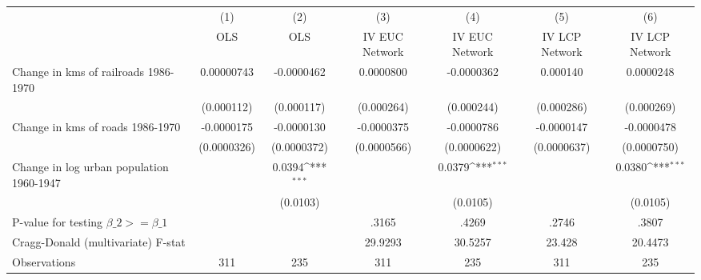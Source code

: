 {
\def\sym#1{\ifmmode^{#1}\else\(^{#1}\)\fi}
\begin{tabular}{l*{6}{c}}
\hline\hline
                &\multicolumn{1}{c}{(1)}&\multicolumn{1}{c}{(2)}&\multicolumn{1}{c}{(3)}&\multicolumn{1}{c}{(4)}&\multicolumn{1}{c}{(5)}&\multicolumn{1}{c}{(6)}\\
                &\multicolumn{1}{c}{OLS}&\multicolumn{1}{c}{OLS}&\multicolumn{1}{c}{IV EUC Network}&\multicolumn{1}{c}{IV EUC Network}&\multicolumn{1}{c}{IV LCP Network}&\multicolumn{1}{c}{IV LCP Network}\\
\hline
Change in kms of railroads 1986-1970&0.00000743         &-0.0000462         &0.0000800         &-0.0000362         & 0.000140         &0.0000248         \\
                &(0.000112)         &(0.000117)         &(0.000264)         &(0.000244)         &(0.000286)         &(0.000269)         \\
[1em]
Change in kms of roads 1986-1970&-0.0000175         &-0.0000130         &-0.0000375         &-0.0000786         &-0.0000147         &-0.0000478         \\
                &(0.0000326)         &(0.0000372)         &(0.0000566)         &(0.0000622)         &(0.0000637)         &(0.0000750)         \\
[1em]
Change in log urban population 1960-1947&                  &   0.0394\sym{***}&                  &   0.0379\sym{***}&                  &   0.0380\sym{***}\\
                &                  & (0.0103)         &                  & (0.0105)         &                  & (0.0105)         \\
\hline
P-value for testing $\beta\_{2} >= \beta\_{1}$&                  &                  &    .3165         &    .4269         &    .2746         &    .3807         \\
Cragg-Donald (multivariate) F-stat&                  &                  &  29.9293         &  30.5257         &   23.428         &  20.4473         \\
Observations    &      311         &      235         &      311         &      235         &      311         &      235         \\
\hline\hline
\end{tabular}
}
